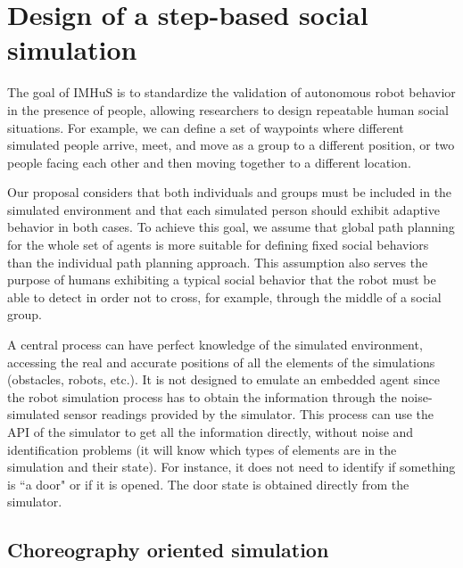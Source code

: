 \section{Design of a step-based social simulation}
\label{sec:design}

The goal of IMHuS is to standardize the validation of autonomous robot behavior in the presence of people, allowing researchers to design repeatable human social situations. For example, we can define a set of waypoints where different simulated people arrive, meet, and move as a group to a different position, or two people facing each other and then moving together to a different location.

Our proposal considers that both individuals and groups must be included in the simulated environment and that each simulated person should exhibit adaptive behavior in both cases. To achieve this goal, we assume that global path planning for the whole set of agents is more suitable for defining fixed social behaviors than the individual path planning approach. This assumption also serves the purpose of humans exhibiting a typical social behavior that the robot must be able to detect in order not to cross, for example, through the middle of a social group.

A central process can have perfect knowledge of the simulated environment, accessing the real and accurate positions of all the elements of the simulations (obstacles, robots, etc.). It is not designed to emulate an embedded agent since the robot simulation process has to obtain the information through the noise-simulated sensor readings provided by the simulator. This process can use the API of the simulator to get all the information directly, without noise and identification problems (it will know which types of elements are in the simulation and their state). For instance, it does not need to identify if something is ``a door" or if it is opened. The door state is obtained directly from the simulator.


\subsection{Choreography oriented simulation}

